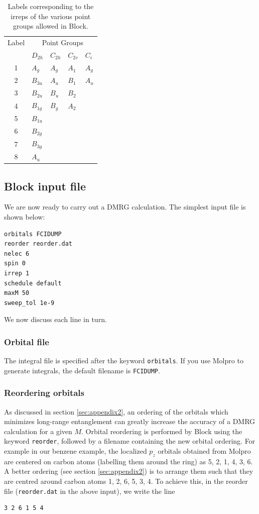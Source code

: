 \documentclass[letterpaper,12pt,aps, pra]{revtex4-1}
\begin{document}
\begin{table}\label{tab:irrep}
\begin{center}
\caption{Labels corresponding to the irreps of the various point groups allowed in Block.}
 \begin{tabular}{cllll}
 \hline
\hline
Label & \multicolumn{4}{c}{Point Groups}\\
&$D_{2h}$&$C_{2h}$&$C_{2v}$&$C_i$\\
\hline
1&$A_g$&$A_g$&$A_1$&$A_g$\\
2&$B_{3u}$&$A_u$&$B_1$&$A_u$\\
3&$B_{2u}$&$B_u$&$B_2$&\\
4&$B_{1g}$&$B_g$&$A_2$&\\
5&$B_{1u}$&&&\\
6&$B_{2g}$&&&\\
7&$B_{3g}$&&&\\
8&$A_u$&&&\\
\hline
\hline
 \end{tabular}
\end{center}
\end{table}

\subsection{Block input file}

We are now ready to carry out a DMRG calculation. The simplest input file is shown below:

\begin{verbatim}
orbitals FCIDUMP
reorder reorder.dat
nelec 6 
spin 0
irrep 1
schedule default
maxM 50
sweep_tol 1e-9
\end{verbatim}

We now discuss each line in turn.

\subsubsection{Orbital file}
The integral file is specified after the keyword \texttt{orbitals}. 
If you use Molpro to generate integrals, the default filename is \texttt{FCIDUMP}.

\subsubsection{Reordering orbitals}

As discussed in section \ref{sec:appendix2}, an ordering of the orbitals which minimizes long-range
entanglement can greatly increase the accuracy
of a DMRG calculation for a given $M$. Orbital reordering is
performed by Block using the keyword \texttt{reorder},
followed by a filename containing the new orbital ordering.
For example in our benzene example, the localized $p_z$ orbitals obtained from Molpro are centered on carbon atoms 
(labelling them around the ring) as 5, 2, 1, 4, 3, 6. A better ordering  (see section \ref{sec:appendix2}) is to
arrange them such that they are centred around carbon atoms 1, 2, 6, 5, 3, 4. 
To achieve this, in the reorder file (\texttt{reorder.dat} in the above input), we write the line
\begin{verbatim}
3 2 6 1 5 4
\end{verbatim}
\end{document}
